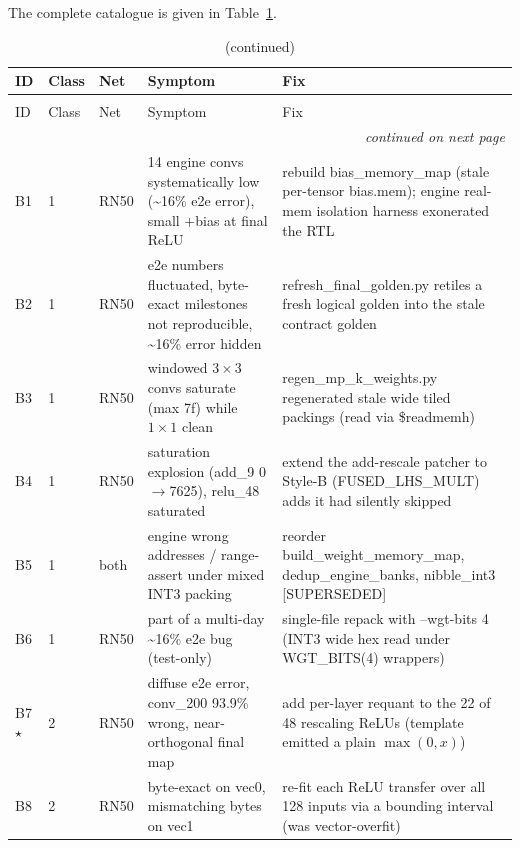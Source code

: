 The complete catalogue is given in Table~\ref{tab:bugindex}.

\begin{footnotesize}
\setlength{\LTchunksize}{12}
\begin{longtable}{@{}l l l p{} p{}@{}}
\caption{Complete index of the 77 indexed bugs. $\star$ marks spine bugs.}\label{tab:bugindex}\\
\toprule
ID & Class & Net & Symptom & Fix \\
\midrule
\endfirsthead
\caption[]{(continued)}\\
\toprule
ID & Class & Net & Symptom & Fix \\
\midrule
\endhead
\midrule
\multicolumn{5}{r}{\textit{continued on next page}}\\
\endfoot
\bottomrule
\endlastfoot
B1 & 1 & RN50 & 14 engine convs systematically low (\textasciitilde{}16\% e2e error), small +bias at final ReLU & rebuild bias\_memory\_map (stale per-tensor bias.mem); engine real-mem isolation harness exonerated the RTL \\
B2 & 1 & RN50 & e2e numbers fluctuated, byte-exact milestones not reproducible, \textasciitilde{}16\% error hidden & refresh\_final\_golden.py retiles a fresh logical golden into the stale contract golden \\
B3 & 1 & RN50 & windowed $3\times3$ convs saturate (max 7f) while $1\times1$ clean & regen\_mp\_k\_weights.py regenerated stale wide tiled packings (read via \$readmemh) \\
B4 & 1 & RN50 & saturation explosion (add\_9 0$\rightarrow$7625), relu\_48 saturated & extend the add-rescale patcher to Style-B (FUSED\_LHS\_MULT) adds it had silently skipped \\
B5 & 1 & both & engine wrong addresses / range-assert under mixed INT3 packing & reorder build\_weight\_memory\_map, dedup\_engine\_banks, nibble\_int3 [SUPERSEDED] \\
B6 & 1 & RN50 & part of a multi-day \textasciitilde{}16\% e2e bug (test-only) & single-file repack with --wgt-bits 4 (INT3 wide hex read under WGT\_BITS(4) wrappers) \\
B7 $\star$ & 2 & RN50 & diffuse e2e error, conv\_200 93.9\% wrong, near-orthogonal final map & add per-layer requant to the 22 of 48 rescaling ReLUs (template emitted a plain \(\max(0,x)\)) \\
B8 & 2 & RN50 & byte-exact on vec0, mismatching bytes on vec1 & re-fit each ReLU transfer over all 128 inputs via a bounding interval (was vector-overfit) \\

\end{longtable}
\end{footnotesize}
